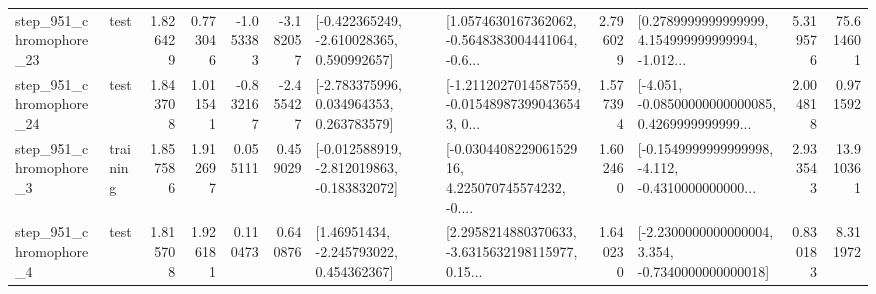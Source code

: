 \begin{tabular}{llrrrrllrlrr}
  step\_951\_chromophore\_23 &      test &      1.826429 &    0.773046 &     -1.053383 & -3.182057 &   [-0.422365249, -2.610028365, 0.590992657] &  [1.0574630167362062, -0.5648383004441064, -0.6... &       2.796029 &  [0.2789999999999999, 4.154999999999994, -1.012... &            5.319576 &         75.614601 \\
  step\_951\_chromophore\_24 &      test &      1.843708 &    1.011541 &     -0.832167 & -2.455427 &    [-2.783375996, 0.034964353, 0.263783579] &  [-1.2112027014587559, -0.015489873990436543, 0... &       1.577394 &  [-4.051, -0.08500000000000085, 0.4269999999999... &            2.004818 &          0.971592 \\
   step\_951\_chromophore\_3 &  training &      1.857586 &    1.912697 &      0.055111 &  0.459029 &  [-0.012588919, -2.812019863, -0.183832072] &  [-0.030440822906152916, 4.225070745574232, -0.... &       1.602460 &  [-0.1549999999999998, -4.112, -0.4310000000000... &            2.933543 &         13.910361 \\
   step\_951\_chromophore\_4 &      test &      1.815708 &    1.926181 &      0.110473 &  0.640876 &     [1.46951434, -2.245793022, 0.454362367] &  [2.2958214880370633, -3.6315632198115977, 0.15... &       1.640230 &  [-2.2300000000000004, 3.354, -0.7340000000000018] &            0.830183 &          8.311972 \\
\bottomrule
\end{tabular}

